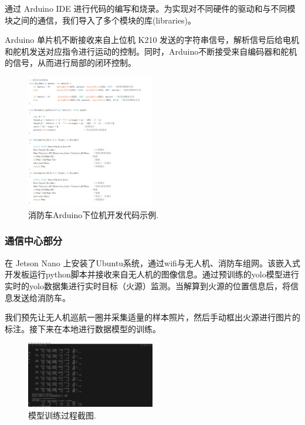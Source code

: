 \documentclass[12pt, a4paper, oneside]{article}
\begin{document}

通过 Arduino IDE 进行代码的编写和烧录。为实现对不同硬件的驱动和与不同模块之间的通信，我们导入了多个模块的库(libraries)。

Arduino 单片机不断接收来自上位机 K210 发送的字符串信号，解析信号后给电机和舵机发送对应指令进行运动的控制。同时，Arduino不断接受来自编码器和舵机的信号，从而进行局部的闭环控制。

\begin{figure}[H]
    \centering
    \includegraphics[width=0.5\textwidth]{image-11.png}
    \caption{消防车Arduino下位机开发代码示例.}
    \label{消防车Arduino下位机开发代码示例}
\end{figure}


\subsubsection{通信中心部分}


在 Jetson Nano 上安装了Ubuntu系统，通过wifi与无人机、消防车组网。该嵌入式开发板运行python脚本并接收来自无人机的图像信息。通过预训练的yolo模型进行实时的yolo数据集进行实时目标（火源）监测。当解算到火源的位置信息后，将信息发送给消防车。


我们预先让无人机巡航一圈并采集适量的样本照片，然后手动框出火源进行图片的标注。接下来在本地进行数据模型的训练。

\begin{figure}[H]
    \centering
    \includegraphics[width=0.5\textwidth]{image-8.png}
    \caption{模型训练过程截图.}
    \label{模型训练过程截图}
\end{figure}
\end{document}
